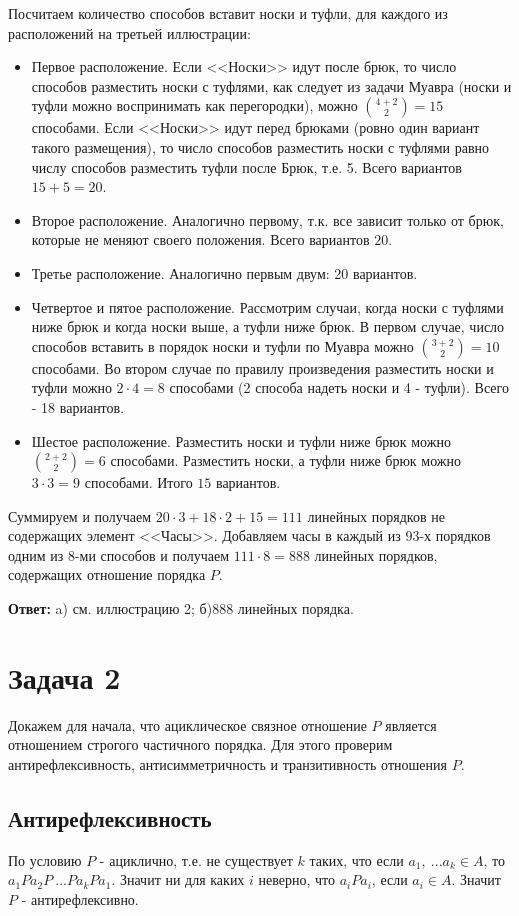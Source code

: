 \documentclass{article}
\begin{document}
	Посчитаем количество способов вставит носки и туфли, для каждого из расположений на третьей иллюстрации:
	\begin{itemize}
		\item Первое расположение. Если <<Носки>> идут после брюк, то число способов разместить носки с туфлями, как следует из задачи Муавра (носки и туфли можно воспринимать как перегородки), можно ${4 + 2 \choose 2} = 15$ способами. Если <<Носки>> идут перед брюками (ровно один вариант такого размещения), то число способов разместить носки с туфлями равно числу способов разместить туфли после Брюк, т.е. 5. Всего вариантов $15 + 5 = 20$.
		\item Второе расположение. Аналогично первому, т.к. все зависит только от брюк, которые не меняют своего положения. Всего вариантов $20$.
		\item Третье расположение. Аналогично первым двум: 20 вариантов.
		\item Четвертое и пятое расположение. Рассмотрим случаи, когда носки с туфлями ниже брюк и когда носки выше, а туфли ниже брюк. В первом случае, число способов вставить в порядок носки и туфли по Муавра можно ${3 + 2 \choose 2} = 10$ способами. Во втором случае по правилу произведения разместить носки и туфли можно $2 \cdot 4 = 8$ способами (2 способа надеть носки и 4 - туфли). Всего - 18 вариантов.
		\item Шестое расположение. Разместить носки и туфли ниже брюк можно ${2 + 2 \choose 2} = 6$ способами. Разместить носки, а туфли ниже брюк можно $3 \cdot 3 = 9$ способами. Итого $15$ вариантов.  
	\end{itemize}

	Суммируем и получаем $20 \cdot 3 + 18 \cdot 2 + 15 = 111$ линейных порядков не содержащих элемент <<Часы>>. Добавляем часы в каждый из 93-х порядков одним из 8-ми способов и получаем $111 \cdot 8 = 888$ линейных порядков, содержащих отношение порядка $P$.
	
	\textbf{Ответ: } a) см. иллюстрацию 2;
					 б)888 линейных порядка.
					
	\section {Задача 2}
	Докажем для начала, что ациклическое связное отношение $P$ является отношением строгого частичного порядка. Для этого проверим антирефлексивность, антисимметричность и транзитивность отношения $P$.
	
	\subsection{Антирефлексивность} 
	По условию $P$ - ациклично, т.е. не существует $k$ таких, что если $a_1, \ ...a_k \in A$, то $a_1Pa_2P\ ...Pa_kPa_1$. Значит ни для каких $i$ неверно, что $a_iPa_i$, если $a_i \in A$. Значит $P$ - антирефлексивно.
	
\end{document}
